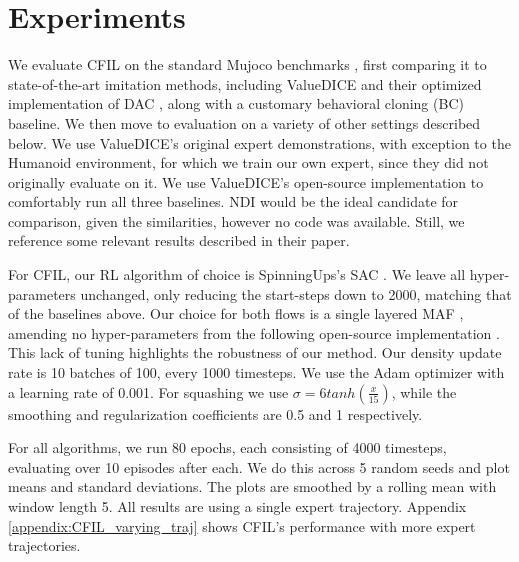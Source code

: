 \section{Experiments}\label{sec:experiments}
We evaluate CFIL on the standard Mujoco benchmarks \cite{todorov2012mujoco}, first comparing it to state-of-the-art imitation methods, including ValueDICE \cite{kostrikov2019imitation} and their optimized implementation of DAC \cite{kostrikov2018discriminator}, along with a customary behavioral cloning (BC) baseline. We then move to evaluation on a variety of other settings described below. We use ValueDICE's original expert demonstrations, with exception to the Humanoid environment, for which we train our own expert, since they did not originally evaluate on it. We use ValueDICE's open-source implementation to comfortably run all three baselines. NDI \cite{kim2021imitation} would be the ideal candidate for comparison, given the similarities, however no code was available. Still, we reference some relevant results described in their paper.


For CFIL, our RL algorithm of choice is SpinningUps's \cite{SpinningUp2018} SAC \cite{haarnoja2018soft}. We leave all hyper-parameters unchanged, only reducing the start-steps down to 2000, matching that of the baselines above.
Our choice for both flows is a single layered MAF \cite{papamakarios2017masked}, amending no hyper-parameters from the following open-source implementation \cite{MAFcode}. This lack of tuning highlights the robustness of our method. 
Our density update rate is 10 batches of 100, every 1000 timesteps. We use the Adam optimizer \cite{kingma2014adam} with a learning rate of 0.001. For squashing we use $\sigma = 6 tanh(\frac{x}{15})$, while the smoothing and regularization coefficients are 0.5 and 1 respectively.


For all algorithms, we run 80 epochs, each consisting of 4000 timesteps, evaluating over 10 episodes after each.
We do this across 5 random seeds and plot means and standard deviations. The plots are smoothed by a rolling mean with window length 5. All results are using a single expert trajectory. Appendix \ref{appendix:CFIL_varying_traj} shows CFIL's performance with more expert trajectories.


